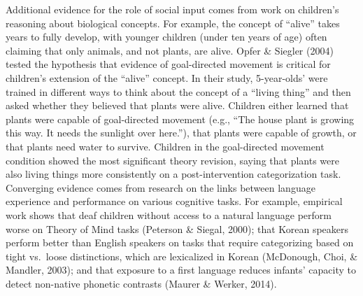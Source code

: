 \documentclass[oneside]{report}
\begin{document}
Additional evidence for the role of social input comes from work on
children's reasoning about biological concepts. For example, the concept
of ``alive'' takes years to fully develop, with younger children (under
ten years of age) often claiming that only animals, and not plants, are
alive. Opfer \& Siegler (2004) tested the hypothesis that evidence of
goal-directed movement is critical for children's extension of the
``alive'' concept. In their study, 5-year-olds' were trained in
different ways to think about the concept of a ``living thing'' and then
asked whether they believed that plants were alive. Children either
learned that plants were capable of goal-directed movement (e.g., ``The
house plant is growing this way. It needs the sunlight over here.''),
that plants were capable of growth, or that plants need water to
survive. Children in the goal-directed movement condition showed the
most significant theory revision, saying that plants were also living
things more consistently on a post-intervention categorization task.
Converging evidence comes from research on the links between language
experience and performance on various cognitive tasks. For example,
empirical work shows that deaf children without access to a natural
language perform worse on Theory of Mind tasks (Peterson \& Siegal,
2000); that Korean speakers perform better than English speakers on
tasks that require categorizing based on tight vs.~loose distinctions,
which are lexicalized in Korean (McDonough, Choi, \& Mandler, 2003); and
that exposure to a first language reduces infants' capacity to detect
non-native phonetic contrasts (Maurer \& Werker, 2014).
\end{document}
